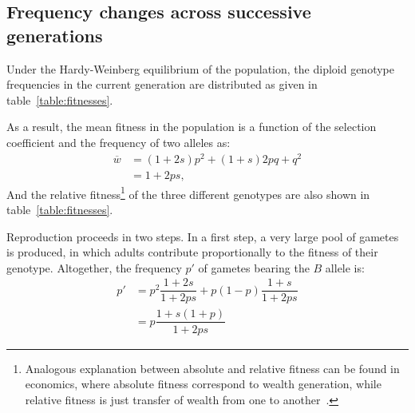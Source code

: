 \subsection{Frequency changes across successive generations}

Under the Hardy-Weinberg equilibrium of the population, the diploid genotype frequencies in the current generation are distributed as given in table~\ref{table:fitnesses}.

\begin{table}[H]
    \centering
    \noindent{}
    \caption[Fitnesses of the different genotypes]{Fitnesses of the different genotypes}\label{table:fitnesses}
\end{table}

As a result, the mean fitness in the population is a function of the selection coefficient and the frequency of two alleles as:
\begin{align}
    \overline{w} &= (1+2s)p^2 + (1+s)2pq + q^2 \\
    &= 1 + 2ps,
\end{align}
And the relative fitness\footnote{Analogous explanation between absolute and relative fitness can be found in economics, where absolute fitness correspond to wealth generation, while relative fitness is just transfer of wealth from one to another~\citep{Masel2016}.} of the three different genotypes are also shown in table~\ref{table:fitnesses}.

Reproduction proceeds in two steps.
In a first step, a very large pool of gametes is produced, in which adults contribute proportionally to the fitness of their genotype.
Altogether, the frequency $p'$ of gametes bearing the $B$ allele is:
\begin{align}
    p' & = p^2 \dfrac{1+2s}{1+2ps} + p(1-p)\dfrac{1+s}{1+2ps}\\
    & = p\dfrac{1+s(1+p)}{1 + 2ps}
\end{align}

